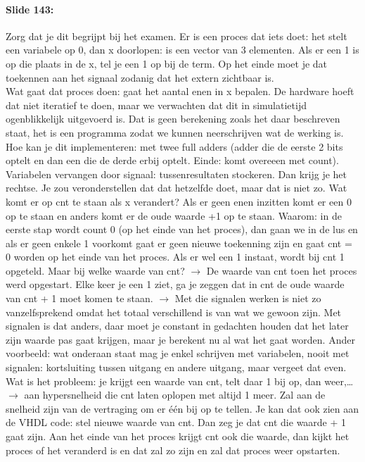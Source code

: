 \documentclass[10pt,a4paper]{book}
\begin{document}
\paragraph{Slide 143:} Zorg dat je dit begrijpt bij het examen. Er is een proces dat iets doet: het stelt een variabele op 0, dan x doorlopen: is een vector van 3 elementen. Als er een 1 is op die plaats in de x, tel je een 1 op bij de term. Op het einde moet je dat toekennen aan het signaal zodanig dat het extern zichtbaar is.\\
Wat gaat dat proces doen: gaat het aantal enen in x bepalen. De hardware hoeft dat niet iteratief te doen, maar we verwachten dat dit in simulatietijd ogenblikkelijk uitgevoerd is. Dat is geen berekening zoals het daar beschreven staat, het is een programma zodat we kunnen neerschrijven wat de werking is.\\
Hoe kan je dit implementeren: met twee full adders (adder die de eerste 2 bits optelt en dan een die de derde erbij optelt. Einde: komt overeeen met count).\\
Variabelen vervangen door signaal: tussenresultaten stockeren. Dan krijg je het rechtse. Je zou veronderstellen dat dat hetzelfde doet, maar dat is niet zo. Wat komt er op cnt te staan als x verandert? Als er geen enen inzitten komt er een 0 op te staan en anders komt er de oude waarde +1 op te staan. Waarom: in de eerste stap wordt count 0 (op het einde van het proces), dan gaan we in de lus en als er geen enkele 1 voorkomt gaat er geen nieuwe toekenning zijn en gaat cnt = 0 worden op het einde van het proces. Als er wel een 1 instaat, wordt bij cnt 1 opgeteld. Maar bij welke waarde van cnt? $\rightarrow$ De waarde van cnt toen het proces werd opgestart. Elke keer je een 1 ziet, ga je zeggen dat in cnt de oude waarde van cnt + 1 moet komen te staan. $\rightarrow$ Met die signalen werken is niet zo vanzelfsprekend omdat het totaal verschillend is van wat we gewoon zijn. Met signalen is dat anders, daar moet je constant in gedachten houden dat het later zijn waarde pas gaat krijgen, maar je berekent nu al wat het gaat worden. Ander voorbeeld: wat onderaan staat mag je enkel schrijven met variabelen, nooit met signalen: kortsluiting tussen uitgang en andere uitgang, maar vergeet dat even. Wat is het probleem: je krijgt een waarde van cnt, telt daar 1 bij op, dan weer,\ldots $\rightarrow$ aan hypersnelheid die cnt laten oplopen met altijd 1 meer. Zal aan de snelheid zijn van de vertraging om er \'e\'en bij op te tellen. Je kan dat ook zien aan de VHDL code: stel nieuwe waarde van cnt. Dan zeg je dat cnt die waarde + 1 gaat zijn. Aan het einde van het proces krijgt cnt ook die waarde, dan kijkt het proces of het veranderd is en dat zal zo zijn en zal dat proces weer opstarten. 
\end{document}
